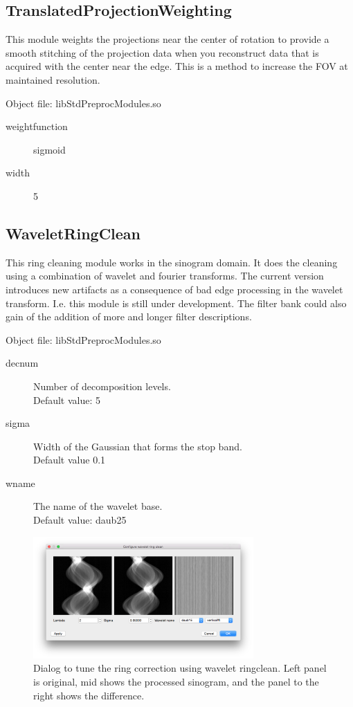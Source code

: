 \documentclass[a4paper]{scrreprt}
\begin{document}
\subsection{TranslatedProjectionWeighting}
This module weights the projections near the center of rotation to provide a smooth stitching of the projection data when you reconstruct data that is acquired with the center near the edge. This is a method to increase the FOV at maintained resolution.

Object file: libStdPreprocModules.so
\begin{description}
 \item[weightfunction] sigmoid
 \item[width] 5
\end{description}

\subsection{WaveletRingClean}
This ring cleaning module works in the sinogram domain. It does the cleaning using a combination of wavelet and fourier transforms\cite{muench2009_stripefilter}. The current version introduces new artifacts as a consequence of bad edge processing in the wavelet transform. I.e. this module is still under development. The filter bank could also gain of the addition of more and longer filter descriptions.

\noindent Object file: libStdPreprocModules.so
\begin{description}
 \item[decnum] Number of decomposition levels. \\Default value: 5
 \item[sigma] Width of the Gaussian that forms the stop band. \\ Default value 0.1
 \item[wname]The name of the wavelet base. \\Default value: daub25
\end{description}
\begin{figure}[ht!]
\centering
\includegraphics[width=0.75\textwidth]{figures/WaveletRingCleanDlg.png}
\caption{Dialog to tune the ring correction using wavelet ringclean. Left panel is original, mid shows the processed sinogram, and the panel to the right shows the difference.}
\end{figure}
\end{document}
